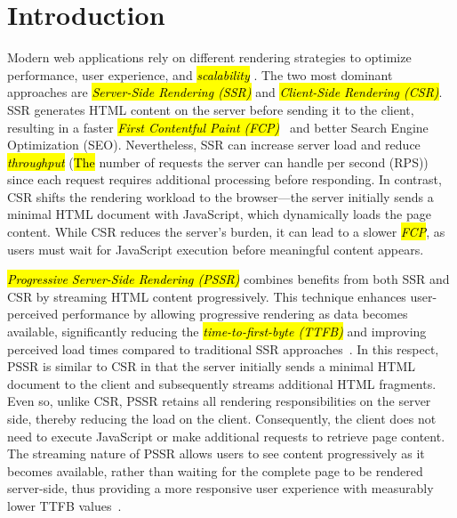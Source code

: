 \documentclass[software,article,accept,pdftex,moreauthors]{Definitions/mdpi}
\begin{document}

\section{Introduction}


Modern web applications rely on different rendering strategies to optimize
performance, user experience, and \textit{\hl{scalability}%
}. The two most dominant
approaches are \textit{\hl{Server-Side Rendering (SSR)}} and \textit{\hl{Client-Side Rendering (CSR)}}. SSR generates HTML content on the server before sending it to the client, resulting in a faster \textit{\hl{First Contentful Paint (FCP)}}~\cite{Edgar2024-FCP} and better Search Engine Optimization (SEO). Nevertheless, SSR
can increase server load and reduce \textit{\hl{throughput}} ({\hl{The} %
 number of
    requests the server can handle per second (RPS)}) since each request requires
additional processing before responding. In contrast, CSR shifts the rendering
workload to the browser---the server initially sends a minimal HTML document with
JavaScript, which dynamically loads the page content. While CSR reduces the
server’s burden, it can lead to a slower \textit{\hl{FCP}}, as users must wait for
JavaScript execution before meaningful content appears.

\textit{\hl{Progressive Server-Side Rendering (PSSR)}} combines benefits from both SSR and CSR
by streaming HTML content progressively. This technique enhances user-perceived performance by
allowing progressive rendering as data becomes available, significantly reducing the
\textit{\hl{time-to-first-byte (TTFB)}} and improving perceived load times compared to traditional
SSR approaches~\cite{wise2024pssr}. In this respect,
PSSR is similar to CSR in that the server initially sends a minimal HTML
document to the client and subsequently streams additional HTML fragments.
Even so, unlike CSR, PSSR retains all rendering responsibilities on the server side,
thereby reducing the load on the client. Consequently, the client does
not need to execute JavaScript or make additional requests to retrieve page content.
The streaming nature of PSSR allows users to see content progressively as it becomes
available, rather than waiting for the complete page to be rendered server-side,
thus providing a more responsive user experience with measurably lower TTFB values~\cite{wise2024pssr}.
\end{document}
